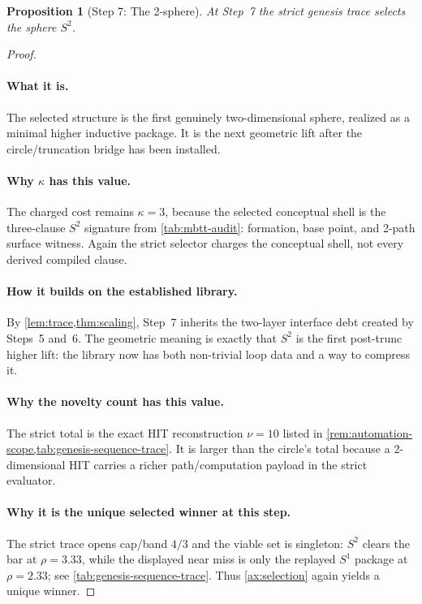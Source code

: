 \documentclass[11pt,a4paper]{article}
\theoremstyle{plain}
\newtheorem{proposition}[theorem]{Proposition}
\theoremstyle{definition}
\theoremstyle{remark}
\begin{document}
\begin{proposition}[Step 7: The 2-sphere]
\label{prop:genesis-step7}
At Step~7 the strict genesis trace selects the sphere $S^2$.
\end{proposition}

\begin{proof}
\paragraph{What it is.}
The selected structure is the first genuinely two-dimensional sphere, realized
as a minimal higher inductive package.
It is the next geometric lift after the circle/truncation bridge has been
installed.

\paragraph{Why $\kappa$ has this value.}
The charged cost remains $\kappa=3$, because the selected conceptual shell is
the three-clause $S^2$ signature from \cref{tab:mbtt-audit}: formation, base
point, and 2-path surface witness.
Again the strict selector charges the conceptual shell, not every derived
compiled clause.

\paragraph{How it builds on the established library.}
By \cref{lem:trace,thm:scaling}, Step~7 inherits the two-layer interface debt
created by Steps~5 and~6.
The geometric meaning is exactly that $S^2$ is the first post-trunc higher lift:
the library now has both non-trivial loop data and a way to compress it.

\paragraph{Why the novelty count has this value.}
The strict total is the exact HIT reconstruction $\nu=10$ listed in
\cref{rem:automation-scope,tab:genesis-sequence-trace}.
It is larger than the circle's total because a 2-dimensional HIT carries a
richer path/computation payload in the strict evaluator.

\paragraph{Why it is the unique selected winner at this step.}
The strict trace opens cap/band $4/3$ and the viable set is singleton:
$S^2$ clears the bar at $\rho=3.33$, while the displayed near miss is only the
replayed $S^1$ package at $\rho=2.33$; see
\cref{tab:genesis-sequence-trace}.
Thus \cref{ax:selection} again yields a unique winner.
\end{proof}
\end{document}
